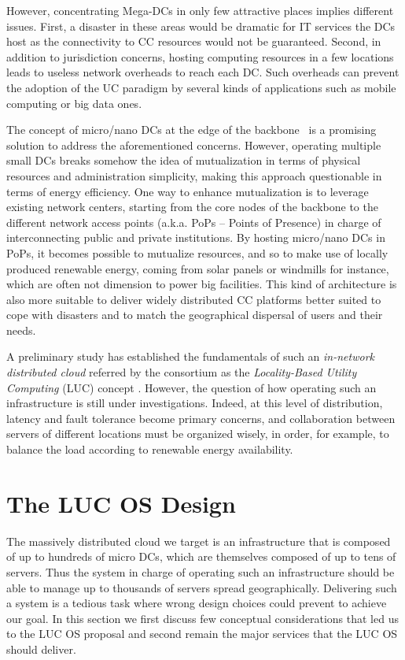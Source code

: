 \documentclass[conference]{IEEEtran}
\begin{document}
However, concentrating Mega-DCs in only few attractive places implies
different issues. First, a disaster 
in these areas would be dramatic for IT services the DCs host as the
connectivity to CC resources would not be guaranteed.
Second,  in addition to jurisdiction concerns, hosting
computing resources in a few locations leads to useless network
overheads to reach each DC. Such overheads can prevent the
adoption of the UC paradigm by several kinds of applications such as mobile
computing or big data ones.

The concept of micro/nano DCs at the edge of the
backbone~\cite{greenberg:2008} is a promising solution to address the
aforementioned concerns. However, operating multiple small DCs breaks
somehow the idea of mutualization in terms of physical resources and
administration simplicity, making this approach questionable in terms
of energy efficiency. One way
to enhance mutualization is to leverage existing network centers,
starting from the core nodes of the backbone to the different network
access points (a.k.a. PoPs – Points of Presence) in charge of
interconnecting public and private institutions.
By hosting micro/nano DCs in PoPs, it becomes possible to mutualize
resources, and so to make use of
locally produced renewable energy, coming from solar panels or windmills 
for instance, which are often not dimension to power big facilities.
This kind of architecture is also more suitable to
deliver widely distributed CC platforms better suited to cope with
disasters and to match the geographical dispersal of users and their
needs.  

A preliminary study has established the fundamentals of such an
\emph{in-network distributed cloud} referred by the consortium  as the
\emph{Locality-Based Utility Computing} (LUC) concept
\cite{lebre:beyond2013}. However, the question of how operating such
an infrastructure is still under investigations. Indeed, at this level of
distribution, latency and fault tolerance become primary concerns, and
collaboration between servers of different locations must be organized
wisely, in order, for example, to balance the load according to renewable
energy availability.




\section{The LUC OS Design}
\label{sec:design}
The massively distributed cloud we target is an infrastructure that is composed of up to
hundreds of micro DCs, which are themselves composed of up to tens of servers. Thus the
system in charge of operating such an infrastructure should be able to manage up to
thousands of servers spread geographically. Delivering such a system is a tedious task
where wrong design choices could prevent to achieve our goal.  In this section we first
discuss few conceptual considerations that led us to the LUC OS proposal and second remain
the major services that the LUC OS should deliver.
\end{document}
